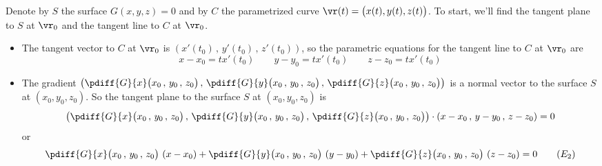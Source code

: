 \begin{solution} 
Denote by $S$ the surface $G(x,y,z)=0$ and by $C$ the parametrized curve 
$\vr(t)=\big(x(t),y(t),z(t)\big)$. To start, we'll find the tangent plane to $S$ at $\vr_0$ and the tangent line to $C$ at $\vr_0$.  
\begin{itemize}
\item
The tangent vector to $C$ at $\vr_0$ is 
$\left( x'(t_0)\,,\,y'(t_0)\,,\,z'(t_0) \right)$, so the parametric equations for
the tangent line to $C$ at $\vr_0$ are
\begin{equation*}
x-x_0 = t x'(t_0)\qquad
y-y_0 = t x'(t_0)\qquad
z-z_0 = t x'(t_0)
\tag{$E_1$}\end{equation*}

\item
The gradient 
$\left(\pdiff{G}{x}\big( x_0\,,\,y_0\,,\,z_0\big)\,,\,
\pdiff{G}{y}\big( x_0\,,\,y_0\,,\,z_0\big)\,,\,
\pdiff{G}{z}\big( x_0\,,\,y_0\,,\,z_0\big)\right)$ is a normal vector 
to the surface $S$ at $(x_0,y_0,z_0)$. So the tangent plane
to the surface $S$ at $(x_0,y_0,z_0)$ is
\begin{equation*}
\left(\pdiff{G}{x}\big( x_0\,,\,y_0\,,\,z_0\big)\,,\,
\pdiff{G}{y}\big( x_0\,,\,y_0\,,\,z_0\big)\,,\,
\pdiff{G}{z}\big( x_0\,,\,y_0\,,\,z_0\big)\right) \cdot
\left( x-x_0\,,\, y-y_0\,,\,z-z_0\right) = 0
\end{equation*}
or
\begin{equation*}
\pdiff{G}{x}\big( x_0\,,\,y_0\,,\,z_0\big)\ (x-x_0)
+\pdiff{G}{y}\big( x_0\,,\,y_0\,,\,z_0\big)\ (y-y_0)
+\pdiff{G}{z}\big( x_0\,,\,y_0\,,\,z_0\big)\ (z-z_0) = 0
\tag{$E_2$}\end{equation*}


\end{itemize}
\end{solution}
